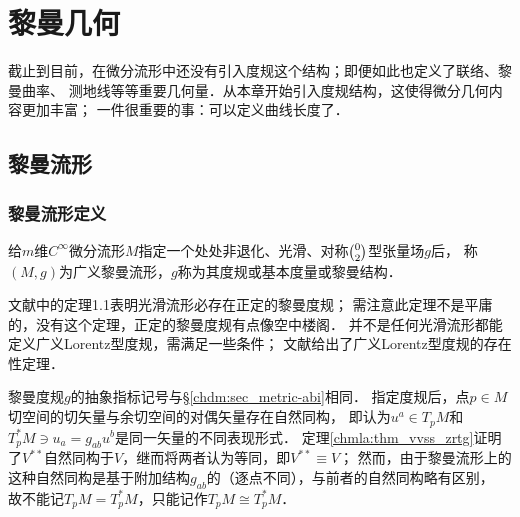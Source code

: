 
\chapter{黎曼几何}\label{chrg}



截止到目前，在微分流形中还没有引入度规这个结构；即便如此也定义了联络、黎曼曲率、
测地线等等重要几何量．从本章开始引入度规结构，这使得微分几何内容更加丰富；
一件很重要的事：可以定义曲线长度了．


\section{黎曼流形}\label{chrg:sec_riemann}
\subsection{黎曼流形定义}
\begin{definition}
    给$m$维$C^\infty$微分流形$M$指定一个处处非退化、光滑、对称$\binom{0}{2}$型张量场$g$后，
    称$(M,g)$为广义{\heiti 黎曼流形}，$g$称为其{\heiti 度规}或{\heiti 基本度量}或{\heiti 黎曼结构}．
\end{definition}


\begin{remark}
    文献\parencite[\S 5.1]{cc2001-zh}中的定理1.1表明光滑流形必存在正定的黎曼度规；
    需注意此定理不是平庸的，没有这个定理，正定的黎曼度规有点像空中楼阁．
    并不是任何光滑流形都能定义广义Lorentz型度规，需满足一些条件；
    文献\parencite[\S 4.1]{kriele-1999}给出了广义Lorentz型度规的存在性定理．
\end{remark}

\begin{remark}
    黎曼度规$g$的抽象指标记号与\S\ref{chdm:sec_metric-abi}相同．
    指定度规后，点$p\in M$切空间的切矢量与余切空间的对偶矢量存在自然同构，
    即认为$u^a\in T_pM$和$T^*_pM \ni u_a = g_{ab}u^b$是同一矢量的不同表现形式．
    定理\ref{chmla:thm_vvss_zrtg}证明了$V^{**}$自然同构于$V$，继而将两者认为等同，即$V^{**}\equiv V$；
    然而，由于黎曼流形上的这种自然同构是基于附加结构$g_{ab}$的（逐点不同），与前者的自然同构略有区别，
    故不能记$T_pM=T^*_pM$，只能记作$T_pM\cong T^*_pM$．
\end{remark}


